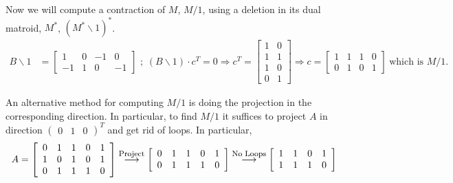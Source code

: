 \documentclass[a4paper, 10pt]{article}
\theoremstyle{definition} %
\begin{document}
Now we will compute a contraction of $M$, $M / 1$, using a deletion in its dual matroid, $M^*$, $(M^* \backslash 1)^*$.
\begin{equation*}
    \begin{split}
        B \backslash 1 & = \left[
            \begin{array}{cccc}
                1 & 0 & -1 & 0 \\
                -1 & 1 & 0 & -1 
            \end{array} 
        \right] \text{ ;} \hspace{5pt}
        (B  \backslash 1)\cdot c^T = 0 \Rightarrow 
        c^T = \left[
                \begin{array}{cc}
                    1 & 0 \\
                    1 & 1 \\
                    1 & 0 \\
                    0 & 1
                \end{array} 
            \right] \Rightarrow
        c = \left[
                \begin{array}{cccc}
                    1 & 1 & 1 & 0 \\
                    0 & 1 & 0 & 1
                \end{array} 
            \right] \hspace{3pt} \text{which is $M / 1$.}
    \end{split}
\end{equation*}

An alternative method for computing $ M / 1$ is doing the projection in the corresponding direction. In particular, to find $ M / 1$ it suffices to project $A$ in direction $\left( \begin{array}{ccc} 0 & 1 & 0 \end{array} \right)^T$ and get rid of loops. In particular,
\begin{equation*}
    \begin{split}
        A & = \left[
            \begin{array}{ccccc}
                0 & 1 & 1 & 0 & 1 \\
                1 & 0 & 1 & 0 & 1 \\
                0 & 1 & 1 & 1 & 0
            \end{array}
        \right]
        \overset{\text{\footnotesize{Project}}}{\longrightarrow}
        \left[
            \begin{array}{ccccc}
                0 & 1 & 1 & 0 & 1 \\
                0 & 1 & 1 & 1 & 0
            \end{array}
        \right]
        \overset{\text{\footnotesize{No Loops}}}{\longrightarrow}
        \left[
            \begin{array}{ccccc}
                1 & 1 & 0 & 1 \\
                1 & 1 & 1 & 0
            \end{array}
        \right]
    \end{split}
\end{equation*}
\end{document}
